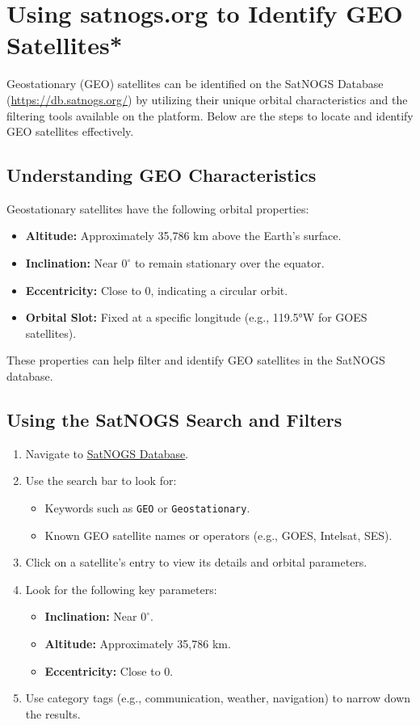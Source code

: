 % 

\section{Using satnogs.org to Identify GEO Satellites*}

Geostationary (GEO) satellites can be identified on the SatNOGS Database (\href{https://db.satnogs.org/}{https://db.satnogs.org/}) by utilizing their unique orbital characteristics and the filtering tools available on the platform. Below are the steps to locate and identify GEO satellites effectively.
\subsection{Understanding GEO Characteristics}
Geostationary satellites have the following orbital properties:
\begin{itemize}
    \item \textbf{Altitude:} Approximately 35,786 km above the Earth's surface.
    \item \textbf{Inclination:} Near $0^\circ$ to remain stationary over the equator.
    \item \textbf{Eccentricity:} Close to 0, indicating a circular orbit.
    \item \textbf{Orbital Slot:} Fixed at a specific longitude (e.g., 119.5°W for GOES satellites).
\end{itemize}

These properties can help filter and identify GEO satellites in the SatNOGS database.

\subsection{Using the SatNOGS Search and Filters}
\begin{enumerate}
    \item Navigate to \href{https://db.satnogs.org/}{SatNOGS Database}.
    \item Use the search bar to look for:
    \begin{itemize}
        \item Keywords such as \texttt{GEO} or \texttt{Geostationary}.
        \item Known GEO satellite names or operators (e.g., GOES, Intelsat, SES).
    \end{itemize}
    \item Click on a satellite’s entry to view its details and orbital parameters.
    \item Look for the following key parameters:
    \begin{itemize}
        \item \textbf{Inclination:} Near $0^\circ$.
        \item \textbf{Altitude:} Approximately 35,786 km.
        \item \textbf{Eccentricity:} Close to 0.
    \end{itemize}
    \item Use category tags (e.g., communication, weather, navigation) to narrow down the results.
\end{enumerate}

